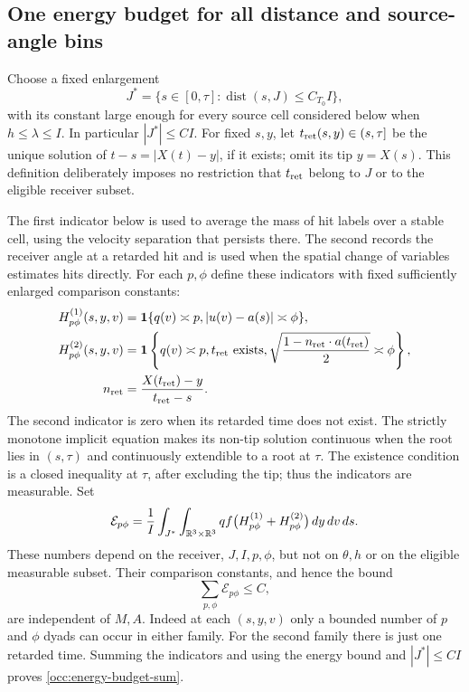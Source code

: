 \subsection{One energy budget for all distance and source-angle bins}

Choose a fixed enlargement
\[
 J^*=\{s\in[0,\tau]:\operatorname{dist}(s,J)\leq C_{T_0}I\},
\]
with its constant large enough for every source cell considered below
when $h\leq\lambda\leq I$. In particular $|J^*|\leq CI$.
For fixed $s,y$, let $t_{\rm ret}(s,y)\in(s,\tau]$ be the unique solution
of $t-s=|X(t)-y|$, if it exists; omit its tip $y=X(s)$.
This definition deliberately imposes no restriction that
$t_{\rm ret}$ belong to $J$ or to the eligible receiver subset.

The first indicator below is used to average the mass of hit labels over
a stable cell, using the velocity separation that persists there.
The second records the receiver angle at a retarded hit and is used
when the spatial change of variables estimates hits directly.
For each $p,\phi$ define these indicators with fixed sufficiently enlarged
comparison constants:
\[
 \begin{split}
 H^{(1)}_{p\phi}(s,y,v)
  &=\mathbf1\{q(v)\asymp p, |u(v)-a(s)|\asymp\phi\},\\
 H^{(2)}_{p\phi}(s,y,v)
  &=\mathbf1\left\{q(v)\asymp p, t_{\rm ret}\text{ exists},
    \sqrt{\frac{1-n_{\rm ret}\cdot a(t_{\rm ret})}{2}}\asymp\phi
                    \right\},\\
 n_{\rm ret}&=\frac{X(t_{\rm ret})-y}{t_{\rm ret}-s}.
 \end{split}
\]
The second indicator is zero when its retarded time does not exist.
The strictly monotone implicit equation makes its non-tip solution
continuous when the root lies in $(s,\tau)$ and continuously extendible
to a root at $\tau$. The existence condition is a closed inequality
at $\tau$, after excluding the tip; thus the indicators are measurable.
Set
\begin{equation}\label{occ:energy-budget}
 \mathcal E_{p\phi}=\frac1I\int_{J^*}\int_{\mathbb R^3\times\mathbb R^3}
 qf\bigl(H^{(1)}_{p\phi}+H^{(2)}_{p\phi}\bigr)\,dy\,dv\,ds.
\end{equation}
These numbers depend on the receiver, $J,I,p,\phi$, but not on
$\theta,h$ or on the eligible measurable subset. Their comparison
constants, and hence the bound
\begin{equation}\label{occ:energy-budget-sum}
 \sum_{p,\phi}\mathcal E_{p\phi}\leq C,
\end{equation}
are independent of $M,A$. Indeed at each $(s,y,v)$ only a bounded number
of $p$ and $\phi$ dyads can occur in either family. For the second family
there is just one retarded time. Summing the indicators and using the
energy bound and $|J^*|\leq CI$ proves \eqref{occ:energy-budget-sum}.

